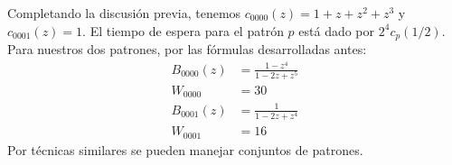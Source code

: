   Completando la discusión previa,
  tenemos \(c_{0000} (z) = 1 + z + z^2 + z^3\)
  y \(c_{0001} (z) = 1\).
  El tiempo de espera para el patrón \(p\)
  está dado por \(2^4 c_p(1/2)\).
  Para nuestros dos patrones,
  por las fórmulas desarrolladas antes:
  \begin{align}
    B_{0000}(z)
      &= \frac{1 - z^4}{1 - 2 z + z^5}
	      \label{B0000-fg} \\
    W_{0000}
      &= 30   \label{B0000-wt} \\
    B_{0001}(z)
      &= \frac{1}{1 - 2 z + z^4}
	      \label{B0001-fg} \\
    W_{0001}
      &= 16   \label{B0001-wt}
  \end{align}
  Por técnicas similares se pueden manejar conjuntos de patrones.

